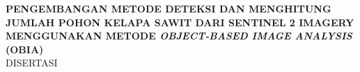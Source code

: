  \newpage
{}
\begin{center}

\begin{figure}[h]
\end{figure}

\vspace{1.0cm}

 {\fontsize{12}{15} \selectfont \textbf{PENGEMBANGAN METODE DETEKSI DAN MENGHITUNG JUMLAH POHON KELAPA SAWIT DARI SENTINEL 2 IMAGERY MENGGUNAKAN METODE \textit{OBJECT-BASED IMAGE ANALYSIS} (OBIA)}}\\

 
\vspace{3cm}
{\large DISERTASI}
\vspace{2cm}




\end{center}
